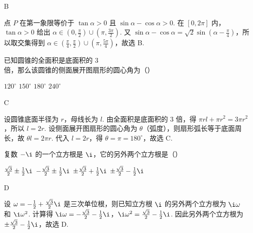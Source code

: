 \documentclass[UTF8,a4paper,oneside,11pt]{ctexbook}
\begin{document}
\begin{answer}
B
\end{answer}

\begin{solution}
点 \(P\) 在第一象限等价于 \(\tan\alpha>0\) 且 \(\sin\alpha-\cos\alpha>0\). 在 \([0,2\pi]\) 内，\(\tan\alpha>0\) 给出
\(\alpha\in\left(0,\frac{\pi}{2}\right)\cup\left(\pi,\frac{3\pi}{2}\right)\). 又
\(\sin\alpha-\cos\alpha=\sqrt{2}\sin\left(\alpha-\frac{\pi}{4}\right)\)，所以取交集得到
\(\alpha\in\left(\frac{\pi}{4},\frac{\pi}{2}\right)\cup\left(\pi,\frac{5\pi}{4}\right)\)，故选 B.
\end{solution}

\begin{problem}
已知圆锥的全面积是底面积的 \(3\) 倍，那么该圆锥的侧面展开图扇形的圆心角为（\quad）

\choices
    {\(120^{\circ}\)}
    {\(150^{\circ}\)}
    {\(180^{\circ}\)}
    {\(240^{\circ}\)}
\end{problem}

\begin{answer}
C
\end{answer}

\begin{solution}
设圆锥底面半径为 \(r\)，母线长为 \(l\). 由全面积是底面积的 \(3\) 倍，得
\(\pi r l+\pi r^{2}=3\pi r^{2}\)，所以 \(l=2r\). 设侧面展开图扇形的圆心角为 \(\theta\)（弧度），则扇形弧长等于底面周长，故 \(\theta l=2\pi r\). 代入 \(l=2r\)，得 \(\theta=\pi=180^{\circ}\)，故选 C.
\end{solution}

\begin{problem}
复数 \(-\i\) 的一个立方根是 \(\i\)，它的另外两个立方根是（\quad）

\choices
    {\(\frac{\sqrt{3}}{2} \pm \frac{1}{2}\i\)}
    {\(-\frac{\sqrt{3}}{2} \pm \frac{1}{2}\i\)}
    {\(\pm\frac{\sqrt{3}}{2} + \frac{1}{2}\i\)}
    {\(\pm\frac{\sqrt{3}}{2} - \frac{1}{2}\i\)}
\end{problem}

\begin{answer}
D
\end{answer}

\begin{solution}
设 \(\omega=-\frac{1}{2}+\frac{\sqrt{3}}{2}\i\) 是三次单位根，则已知立方根 \(\i\) 的另外两个立方根为 \(\i\omega\) 和 \(\i\omega^{2}\). 计算得
\(\i\omega=-\frac{\sqrt{3}}{2}-\frac{1}{2}\i\)，\(\i\omega^{2}=\frac{\sqrt{3}}{2}-\frac{1}{2}\i\). 因此另外两个立方根为 \(\pm\frac{\sqrt{3}}{2}-\frac{1}{2}\i\)，故选 D.
\end{solution}
\end{document}
